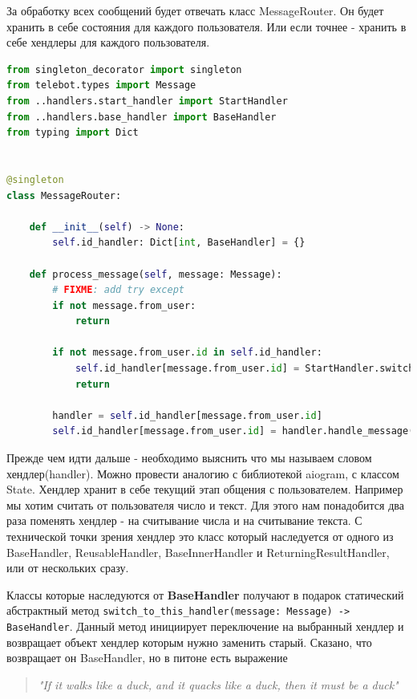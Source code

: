 \documentclass[12pt]{extarticle}
\begin{document}
За обработку всех сообщений будет отвечать класс MessageRouter. Он будет хранить в себе состояния для каждого пользователя. Или если точнее - хранить в себе хендлеры для каждого пользователя.

\begin{lstlisting}[language=Python,style=mystyle,caption=MessageRouter.py]
from singleton_decorator import singleton
from telebot.types import Message
from ..handlers.start_handler import StartHandler
from ..handlers.base_handler import BaseHandler
from typing import Dict


@singleton
class MessageRouter:

    def __init__(self) -> None:
        self.id_handler: Dict[int, BaseHandler] = {}

    def process_message(self, message: Message):
        # FIXME: add try except
        if not message.from_user:
            return

        if not message.from_user.id in self.id_handler:
            self.id_handler[message.from_user.id] = StartHandler.switch_to_this_handler(message)
            return
            
        handler = self.id_handler[message.from_user.id]
        self.id_handler[message.from_user.id] = handler.handle_message(message)
\end{lstlisting}

Прежде чем идти дальше - необходимо выяснить что мы называем словом хендлер(handler). Можно провести аналогию с библиотекой aiogram, с классом State. Хендлер хранит в себе текущий этап общения с пользователем. Например мы хотим считать от пользователя число и текст. Для этого нам понадобится два раза поменять хендлер - на считывание числа и на считывание текста. С технической точки зрения хендлер это класс который наследуется от одного из BaseHandler, ReusableHandler, BaseInnerHandler и ReturningResultHandler, или от нескольких сразу.

Классы которые наследуются от \textbf{BaseHandler} получают в подарок статический абстрактный метод \verb|switch_to_this_handler(message: Message) -> BaseHandler|. Данный метод инициирует переключение на выбранный хендлер и возвращает объект хендлер которым нужно заменить старый. Сказано, что возвращает он BaseHandler, но в питоне есть выражение 

\begin{quote}
    \textit{"If it walks like a duck, and it quacks like a duck, then it must be a duck"}
\end{quote}
\end{document}

